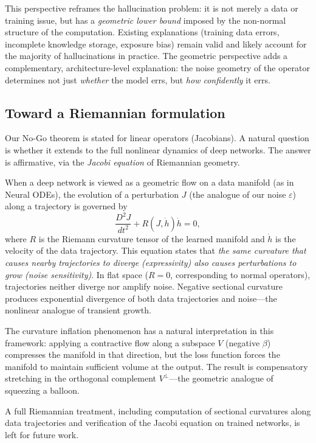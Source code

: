 \documentclass[11pt,a4paper]{article}
\theoremstyle{definition}
\begin{document}
This perspective reframes the hallucination problem: it is not
merely a data or training issue, but has a \emph{geometric lower
bound} imposed by the non-normal structure of the computation.
Existing explanations (training data errors, incomplete knowledge
storage, exposure bias) remain valid and likely account for the
majority of hallucinations in practice. The geometric perspective
adds a complementary, architecture-level explanation: the noise
geometry of the operator determines not just \emph{whether} the
model errs, but \emph{how confidently} it errs.

\subsection{Toward a Riemannian formulation}

Our No-Go theorem is stated for linear operators (Jacobians). A
natural question is whether it extends to the full nonlinear
dynamics of deep networks. The answer is affirmative, via the
\emph{Jacobi equation} of Riemannian geometry.

When a deep network is viewed as a geometric flow on a data
manifold (as in Neural ODEs), the evolution of a perturbation
$J$ (the analogue of our noise $\varepsilon$) along a trajectory
is governed by
\[
  \frac{D^2 J}{dt^2} + R(J, \dot{h})\dot{h} = 0,
\]
where $R$ is the Riemann curvature tensor of the learned manifold
and $\dot{h}$ is the velocity of the data trajectory. This equation
states that \emph{the same curvature that causes nearby trajectories
to diverge (expressivity) also causes perturbations to grow
(noise sensitivity)}. In flat space ($R = 0$, corresponding to
normal operators), trajectories neither diverge nor amplify noise.
Negative sectional curvature produces exponential divergence of
both data trajectories and noise---the nonlinear analogue of
transient growth.

The curvature inflation phenomenon has a natural interpretation
in this framework: applying a contractive flow along a subspace
$V$ (negative $\beta$) compresses the manifold in that direction,
but the loss function forces the manifold to maintain sufficient
volume at the output. The result is compensatory stretching
in the orthogonal complement $V^\perp$---the geometric analogue
of squeezing a balloon.

A full Riemannian treatment, including computation of sectional
curvatures along data trajectories and verification of the Jacobi
equation on trained networks, is left for future work.
\end{document}
